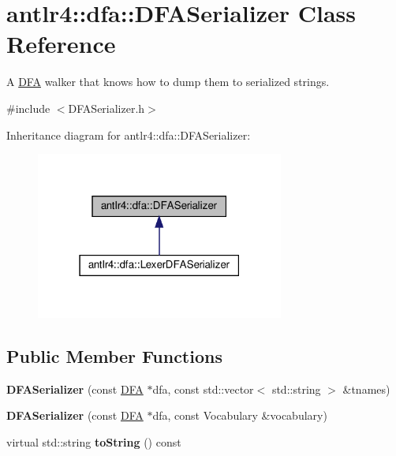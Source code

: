 \hypertarget{classantlr4_1_1dfa_1_1DFASerializer}{}\section{antlr4\+:\+:dfa\+:\+:D\+F\+A\+Serializer Class Reference}
\label{classantlr4_1_1dfa_1_1DFASerializer}


A \hyperlink{classantlr4_1_1dfa_1_1DFA}{D\+FA} walker that knows how to dump them to serialized strings.  




{\ttfamily \#include $<$D\+F\+A\+Serializer.\+h$>$}



Inheritance diagram for antlr4\+:\+:dfa\+:\+:D\+F\+A\+Serializer\+:
\nopagebreak
\begin{figure}[H]
\begin{center}
\leavevmode
\includegraphics[width=231pt]{classantlr4_1_1dfa_1_1DFASerializer__inherit__graph}
\end{center}
\end{figure}
\subsection*{Public Member Functions}
\begin{DoxyCompactItemize}
\item 
\mbox{\label{classantlr4_1_1dfa_1_1DFASerializer_a4ddb2f4485acb92f0d7c788cc6e3550c}} 
{\bfseries D\+F\+A\+Serializer} (const \hyperlink{classantlr4_1_1dfa_1_1DFA}{D\+FA} $\ast$dfa, const std\+::vector$<$ std\+::string $>$ \&tnames)
\item 
\mbox{\label{classantlr4_1_1dfa_1_1DFASerializer_a53b2f8347bf1964c90d0085ae16b0777}} 
{\bfseries D\+F\+A\+Serializer} (const \hyperlink{classantlr4_1_1dfa_1_1DFA}{D\+FA} $\ast$dfa, const Vocabulary \&vocabulary)
\item 
\mbox{\label{classantlr4_1_1dfa_1_1DFASerializer_a3a459289bc5dac02365e5474a51ade1d}} 
virtual std\+::string {\bfseries to\+String} () const
\end{DoxyCompactItemize}

